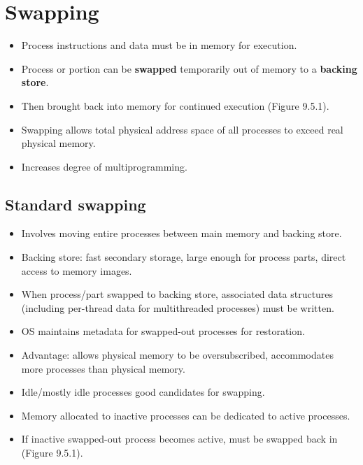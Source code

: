 \section{Swapping}

\begin{itemize}
    \item Process instructions and data must be in memory for execution.
    \item Process or portion can be \textbf{swapped} temporarily out of memory to a \textbf{backing store}.
    \item Then brought back into memory for continued execution (Figure 9.5.1).
    \item Swapping allows total physical address space of all processes to exceed real physical memory.
    \item Increases degree of multiprogramming.
\end{itemize}

\subsection{Standard swapping}
\begin{itemize}
    \item Involves moving entire processes between main memory and backing store.
    \item Backing store: fast secondary storage, large enough for process parts, direct access to memory images.
    \item When process/part swapped to backing store, associated data structures (including per-thread data for multithreaded processes) must be written.
    \item OS maintains metadata for swapped-out processes for restoration.
    \item Advantage: allows physical memory to be oversubscribed, accommodates more processes than physical memory.
    \item Idle/mostly idle processes good candidates for swapping.
    \item Memory allocated to inactive processes can be dedicated to active processes.
    \item If inactive swapped-out process becomes active, must be swapped back in (Figure 9.5.1).
\end{itemize}

